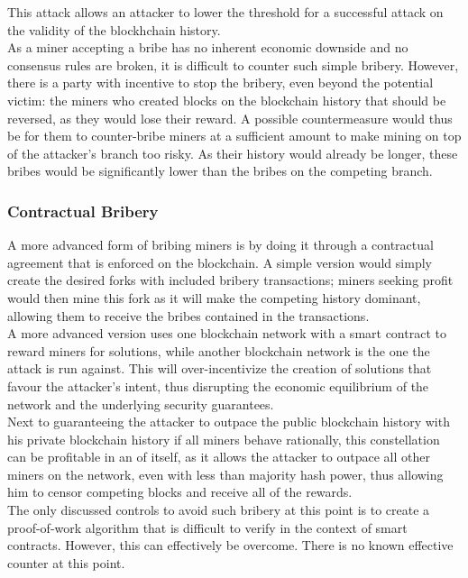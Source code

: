 \documentclass[12pt,a4paper]{article}
\begin{document}
This attack allows an attacker to lower the threshold for a successful attack on the validity of the blockhchain history.\\

As a miner accepting a bribe has no inherent economic downside and no consensus rules are broken, it is difficult to counter such simple bribery. However, there is a party with incentive to stop the bribery, even beyond the potential victim: the miners who created blocks on the blockchain history that should be reversed, as they would lose their reward. A possible countermeasure would thus be for them to counter-bribe miners at a sufficient amount to make mining on top of the attacker's branch too risky. As their history would already be longer, these bribes would be significantly lower than the bribes on the competing branch.\\

\subsubsection{Contractual Bribery}

A more advanced form of bribing miners is by doing it through a contractual agreement that is enforced on the blockchain. A simple version would simply create the desired forks with included bribery transactions; miners seeking profit would then mine this fork as it will make the competing history dominant, allowing them to receive the bribes contained in the transactions.\\

A more advanced version uses one blockchain network with a smart contract to reward miners for solutions, while another blockchain network is the one the attack is run against. This will over-incentivize the creation of solutions that favour the attacker's intent, thus disrupting the economic equilibrium of the network and the underlying security guarantees.\\

Next to guaranteeing the attacker to outpace the public blockchain history with his private blockchain history if all miners behave rationally, this constellation can be profitable in an of itself, as it allows the attacker to outpace all other miners on the network, even with less than majority hash power, thus allowing him to censor competing blocks and receive all of the rewards.\\

The only discussed controls to avoid such bribery at this point is to create a proof-of-work algorithm that is difficult to verify in the context of smart contracts. However, this can effectively be overcome. There is no known effective counter at this point.\\
\end{document}
